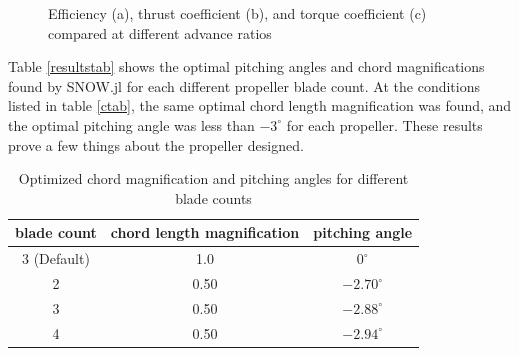 \documentclass[journal ]{new-aiaa}
\newcounter{ctab}
\begin{document}
\begin{figure}[H]
\centering

	\hspace{1em}
	\caption{Efficiency (a), thrust coefficient (b), and torque coefficient (c) compared at different advance ratios}
	\captionsetup{aboveskip=0pt,font=it}
	\label{efftqtab}
\end{figure}

Table \eqref{resultstab} shows the optimal pitching angles and chord magnifications found by SNOW.jl for each different propeller blade count. At the conditions listed in table \eqref{ctab}, the same optimal chord length magnification was found, and the optimal pitching angle was less than $-3^{\circ}$ for each propeller. These results prove a few things about the propeller designed.

\begin{table}[H]
 \centering
 \begin{tabular}{| c | c | c |} \hline
 	 \textbf{blade count} & \textbf{chord length magnification} & \textbf{pitching angle} \\ \hline
  	 3 (Default) & 1.0 & $0^{\circ}$ \\ \hline
  	 2 & 0.50 & $-2.70^{\circ}$ \\ \hline
  	 3 & 0.50 & $-2.88^{\circ}$ \\ \hline
  	 4 & 0.50 & $-2.94^{\circ}$ \\ \hline
 \end{tabular}
 \caption{Optimized chord magnification and pitching angles for different blade counts}
 \label{resultstab}
\end{table}
\end{document}
